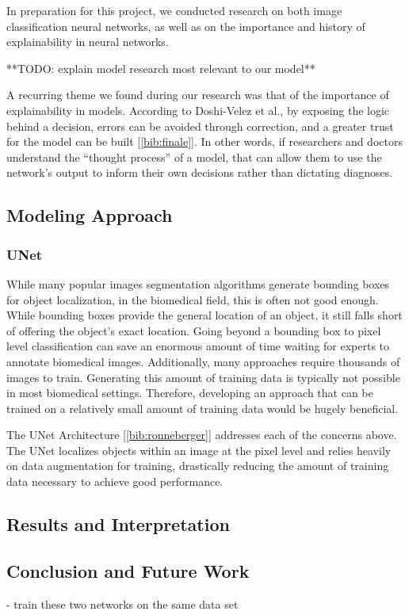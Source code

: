 \documentclass[12pt]{article}
\begin{document}
{In preparation for this project, we conducted research on both image classification neural networks, as well as on the importance and history of explainability in neural networks.

**TODO: explain model research most relevant to our model**

A recurring theme we found during our research was that of the importance of explainability in models. According to Doshi-Velez et al., by exposing the logic behind a decision, errors can be avoided through correction, and a greater trust for the model can be built [\ref{bib:finale}]. In other words, if researchers and doctors understand the ``thought process'' of a model,  that can allow them to use the network's output to inform their own decisions rather than dictating diagnoses. 

\subsection*{Modeling Approach}

\subsubsection*{UNet}
While many popular images segmentation algorithms generate bounding boxes for object localization, in the biomedical field, this is often not good enough. While bounding boxes provide the general location of an object, it still falls short of offering the object's exact location. Going beyond a bounding box to pixel level classification can save an enormous amount of time waiting for experts to annotate biomedical images. Additionally, many approaches require thousands of images to train. Generating this amount of training data is typically not possible in most biomedical settings. Therefore, developing an approach that can be trained on a relatively small amount of training data would be hugely beneficial.  

The UNet Architecture [\ref{bib:ronneberger}] addresses each of the concerns above. The UNet localizes objects within an image at the pixel level and relies heavily on data augmentation for training, drastically reducing the amount of training data necessary to achieve good performance. 

\subsection*{Results and Interpretation}

\subsection*{Conclusion and Future Work}
- train these two networks on the same data set

}
\end{document}
